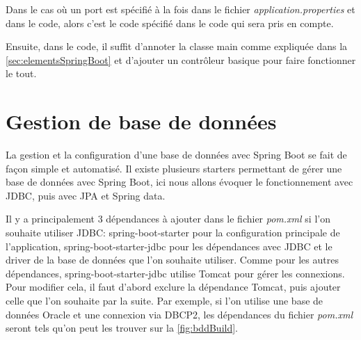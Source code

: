 \documentclass{polytech/polytech}
\begin{document}
Dans le cas où un port est spécifié à la fois dans le fichier \textit{application.properties} et dans le code, alors c’est le code spécifié dans le code qui sera pris en compte.

Ensuite, dans le code, il suffit d’annoter la classe main comme expliquée dans la \autoref{sec:elementsSpringBoot} et d’ajouter un contrôleur basique pour faire fonctionner le tout. 

\section{Gestion de base de données}

La gestion et la configuration d’une base de données avec Spring Boot se fait de façon simple et automatisé. Il existe plusieurs starters permettant de gérer une base de données avec Spring Boot, ici nous allons évoquer le fonctionnement avec JDBC, puis avec JPA et Spring data.

Il y a principalement 3 dépendances à ajouter dans le fichier \textit{pom.xml} si l’on souhaite utiliser JDBC: spring-boot-starter pour la configuration principale de l’application, spring-boot-starter-jdbc pour les dépendances avec JDBC et le driver de la base de données que l’on souhaite utiliser. Comme pour les autres dépendances, spring-boot-starter-jdbc utilise Tomcat pour gérer les connexions. Pour modifier cela, il faut d’abord exclure la dépendance Tomcat, puis ajouter celle que l’on souhaite par la suite. Par exemple, si l’on utilise une base de données Oracle et une connexion via DBCP2, les dépendances du fichier \textit{pom.xml} seront tels qu'on peut les trouver sur la \autoref{fig:bddBuild}. 
\end{document}
